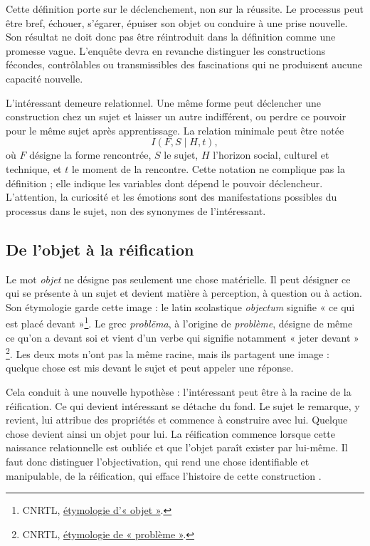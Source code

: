 \documentclass[11pt,a4paper]{article}
\begin{document}
Cette définition porte sur le déclenchement, non sur la réussite. Le processus
peut être bref, échouer, s'égarer, épuiser son objet ou conduire à une prise
nouvelle. Son résultat ne doit donc pas être réintroduit dans la définition
comme une promesse vague. L'enquête devra en revanche distinguer les
constructions fécondes, contrôlables ou transmissibles des fascinations qui ne
produisent aucune capacité nouvelle.

L'intéressant demeure relationnel. Une même forme peut déclencher une
construction chez un sujet et laisser un autre indifférent, ou perdre ce pouvoir
pour le même sujet après apprentissage. La relation minimale peut être notée
\[
  I(F,S\mid H,t),
\]
où \(F\) désigne la forme rencontrée, \(S\) le sujet, \(H\) l'horizon social,
culturel et technique, et \(t\) le moment de la rencontre. Cette notation ne
complique pas la définition ; elle indique les variables dont dépend le pouvoir
déclencheur. L'attention, la curiosité et les émotions sont des manifestations
possibles du processus dans le sujet, non des synonymes de l'intéressant.

\subsection{De l'objet à la réification}

Le mot \emph{objet} ne désigne pas seulement une chose matérielle. Il peut
désigner ce qui se présente à un sujet et devient matière à perception, à
question ou à action. Son étymologie garde cette image : le latin scolastique
\emph{objectum} signifie « ce qui est placé devant »\footnote{CNRTL,
\href{https://www.cnrtl.fr/etymologie/objet}{étymologie d'« objet »}.}.
Le grec \emph{problēma}, à l'origine de \emph{problème}, désigne de même ce
qu'on a devant soi et vient d'un verbe qui signifie notamment « jeter devant »
\footnote{CNRTL,
\href{https://www.cnrtl.fr/etymologie/probleme}{étymologie de
« problème »}.}. Les deux mots n'ont pas la même racine, mais ils partagent
une image : quelque chose est mis devant le sujet et peut appeler une réponse.

Cela conduit à une nouvelle hypothèse : l'intéressant peut être à la racine de
la réification. Ce qui devient intéressant se détache du fond. Le sujet le
remarque, y revient, lui attribue des propriétés et commence à construire avec
lui. Quelque chose devient ainsi un objet pour lui. La réification commence
lorsque cette naissance relationnelle est oubliée et que l'objet paraît exister
par lui-même. Il faut donc distinguer l'objectivation, qui rend une chose
identifiable et manipulable, de la réification, qui efface l'histoire de cette
construction \parencite{pachet2004reification}.
\end{document}
